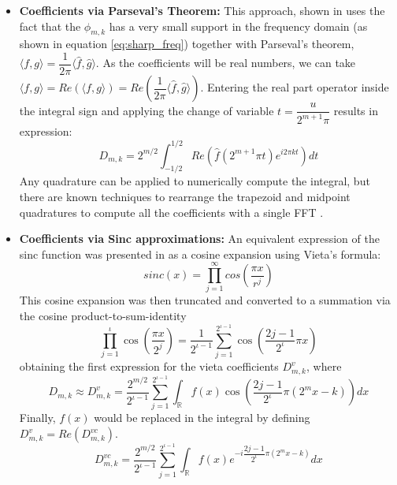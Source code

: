 \documentclass[12,twoside]{mammeTFM}
\theoremstyle{definition}
\theoremstyle{remark}
\begin{document}
\begin{itemize}
\item{ \textbf{Coefficients via Parseval's Theorem: } This approach, shown in \cite{ort16} uses the fact that the $\phi_{m,k}$ has a very small support in the frequency domain (as shown in equation \ref{eq:sharp_freq}) together with Parseval's theorem, 
$\langle f, g \rangle = \dfrac{1}{2 \pi}\langle \hat{f}, \hat{g} \rangle$. As the coefficients will be real numbers, we can take $\langle f, g \rangle = Re \left( \langle f, g \rangle \right) = Re \left( \dfrac{1}{2 \pi}\langle \hat{f}, \hat{g} \rangle \right)$. Entering the real part operator inside the integral sign and applying the change of variable $t = \dfrac{u}{2^{m+1} \pi}$ results in expression:
\begin{equation}
D_{m,k} = 2^{m/2} \int_{-1/2}^{1/2} Re \left(\hat{f}(2^{m+1} \pi t) e^{i2\pi k t} \right) dt
\end{equation} 
Any quadrature can be applied to numerically compute the integral, but there are known techniques to rearrange the trapezoid and midpoint quadratures to compute all the coefficients with a single FFT \cite{mar17, flo20}.
}
\item { \textbf{Coefficients via Sinc approximations: }
An equivalent expression of the sinc function was presented in \cite{Ortiz-Gracia2016} as a cosine expansion using Vieta's formula: 
\begin{equation}
sinc(x) = \prod_{j = 1}^{\infty} cos \left( \dfrac{\pi x}{r^j} \right)
\end{equation}
This cosine expansion was then truncated and converted to a summation via the cosine product-to-sum-identity
\begin{equation} \label{eq:density_v}
\prod_{j=1}^{\iota} \cos \left(\frac{\pi x}{2^{j}}\right)=\frac{1}{2^{\iota-1}} \sum_{j=1}^{2^{\iota-1}} \cos \left(\frac{2 j-1}{2^{\iota}} \pi x\right)
\end{equation}
obtaining the first expression for the vieta coefficients $D_{m,k}^v$, where
\begin{equation}
D_{m,k} \approx D_{m,k}^{v}= \frac{2^{m / 2}}{2^{\iota-1}} \sum_{j=1}^{2^{\iota-1}} \int_{\mathbb{R}} f(x) \cos \left(\frac{2 j-1}{2^{\iota}} \pi\left(2^{m} x-k\right)\right) d x
\end{equation} \label{eq:density_vc}
Finally, $f(x)$ would be replaced in the integral by defining $D_{m,k}^{v} = Re \left( D_{m,k}^{vc} \right)$. 
\begin{equation}
D_{m,k}^{vc} =  \dfrac{2^{m / 2}}{2^{\iota-1}} \sum_{j=1}^{2^{\iota-1}} \int_{\mathbb{R}} f(x) e^{-i\dfrac{2 j-1}{2^{\iota}} \pi\left(2^{m} x-k\right) } d x

\end{equation}}
\end{itemize}
\end{document}

